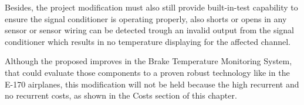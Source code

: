 Besides, the project modification must also still provide built-in-test capability to ensure the signal conditioner is operating properly, also shorts or opens in any sensor or sensor wiring can be detected trough an invalid output from the signal conditioner which results in no temperature displaying for the affected channel.

Although the proposed improves in the Brake Temperature Monitoring System, that could evaluate those components to a proven robust technology like in the E-170 airplanes, this modification will not be held because the high recurrent and no recurrent costs, as shown in the Costs section of this chapter.
